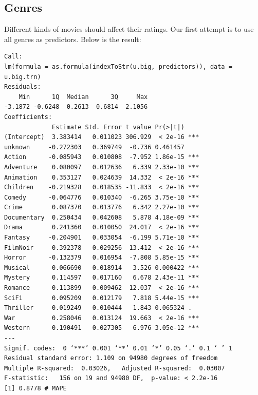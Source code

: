 \documentclass[11pt]{article}
\begin{document}
\subsection{Genres}
Different kinds of movies should affect their ratings. Our first 
attempt is to use all genres as predictors. Below is the result:
\begin{verbatim}
Call:
lm(formula = as.formula(indexToStr(u.big, predictors)), data = u.big.trn)
Residuals:
    Min      1Q  Median      3Q     Max 
-3.1872 -0.6248  0.2613  0.6814  2.1056 
Coefficients:
             Estimate Std. Error t value Pr(>|t|)    
(Intercept)  3.383414   0.011023 306.929  < 2e-16 ***
unknown     -0.272303   0.369749  -0.736 0.461457    
Action      -0.085943   0.010808  -7.952 1.86e-15 ***
Adventure    0.080097   0.012636   6.339 2.33e-10 ***
Animation    0.353127   0.024639  14.332  < 2e-16 ***
Children    -0.219328   0.018535 -11.833  < 2e-16 ***
Comedy      -0.064776   0.010340  -6.265 3.75e-10 ***
Crime        0.087370   0.013776   6.342 2.27e-10 ***
Documentary  0.250434   0.042608   5.878 4.18e-09 ***
Drama        0.241360   0.010050  24.017  < 2e-16 ***
Fantasy     -0.204901   0.033054  -6.199 5.71e-10 ***
FilmNoir     0.392378   0.029256  13.412  < 2e-16 ***
Horror      -0.132379   0.016954  -7.808 5.85e-15 ***
Musical      0.066690   0.018914   3.526 0.000422 ***
Mystery      0.114597   0.017160   6.678 2.43e-11 ***
Romance      0.113899   0.009462  12.037  < 2e-16 ***
SciFi        0.095209   0.012179   7.818 5.44e-15 ***
Thriller     0.019249   0.010444   1.843 0.065324 .  
War          0.258046   0.013124  19.663  < 2e-16 ***
Western      0.190491   0.027305   6.976 3.05e-12 ***
---
Signif. codes:  0 ‘***’ 0.001 ‘**’ 0.01 ‘*’ 0.05 ‘.’ 0.1 ‘ ’ 1
Residual standard error: 1.109 on 94980 degrees of freedom
Multiple R-squared:  0.03026,	Adjusted R-squared:  0.03007 
F-statistic:   156 on 19 and 94980 DF,  p-value: < 2.2e-16
[1] 0.8778 # MAPE
\end{verbatim}
\end{document}
